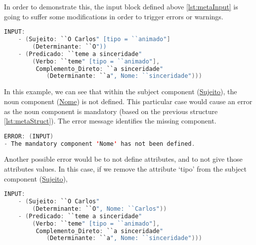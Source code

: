 In order to demonstrate this, the input block defined above \autoref{lst:metaInput} is going to suffer some modifications in order to trigger errors or warnings.

\begin{center}
\begin{minipage}{13cm}
\begin{lstlisting}[language=java, basicstyle=\small, label={lst:meta_input_missing_comp}, caption=Example of the students parsing with missing component]
INPUT:
    - (Sujeito: ``O Carlos" [tipo = ``animado"]
        (Determinante: ``O"))
    - (Predicado: ``teme a sinceridade" 
        (Verbo: ``teme" [tipo = ``animado"], 
         Complemento_Direto: ``a sinceridade" 
            (Determinante: ``a", Nome: ``sinceridade")))
\end{lstlisting}
\end{minipage}
\end{center}

In this example, we can see that within the subject component (\underline{Sujeito}), the noun component (\underline{Nome}) is not defined. 
This particular case would cause an error as the noun component is mandatory (based on the previous structure \autoref{lst:metaStruct}). 
The error message identifies the missing component.

\begin{center}
\begin{minipage}{13cm}
\begin{lstlisting}[language=java, basicstyle=\small, label={lst:err_msg_missing_comp}, caption=Example error message of missing component]
ERROR: (INPUT) 
- The mandatory component 'Nome' has not been defined.
\end{lstlisting}
\end{minipage}
\end{center}
Another possible error would be to not define attributes, and to not give those attributes values. In this case, if we remove the attribute ‘tipo’ from the subject 
component (\underline{Sujeito}),

\begin{center}
\begin{minipage}{13cm}
\begin{lstlisting}[language=java, basicstyle=\small, label={lst:meta_input_missing_attr}, caption=Example of the students parsing with missing attribute]
INPUT:
    - (Sujeito: ``O Carlos"
        (Determinante: ``O", Nome: ``Carlos"))
    - (Predicado: ``teme a sinceridade" 
        (Verbo: ``teme" [tipo = ``animado"], 
         Complemento_Direto: ``a sinceridade" 
            (Determinante: ``a", Nome: ``sinceridade")))
\end{lstlisting}
\end{minipage}
\end{center}

